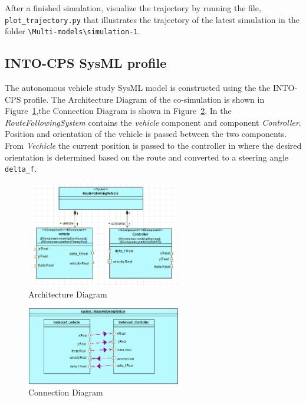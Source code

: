 After a finished simulation, visualize the trajectory by running the file, \texttt{plot\_trajectory.py} that illustrates the trajectory of the latest simulation in the folder \texttt{\textbackslash Multi-models\textbackslash si\-mu\-la\-tion-1}. 

\subsection{INTO-CPS SysML profile}
The autonomous vehicle study SysML model is constructed using the the INTO-CPS profile. The Architecture Diagram of the co-simulation is shown in Figure~\ref{fig:bicycle_architecture_diagram},the Connection Diagram is shown in Figure~\ref{fig:bicycle_connection_diagram}.
In the \textit{RouteFollowingSystem} contains the \textit{vehicle} component and component \textit{Controller}. Position and orientation of the vehicle is passed between the two components. From \textit{Vechicle} the current position is passed to the controller in where the desired orientation is determined based on the route and converted to a steering angle \texttt{delta\_f}. 
	\begin{figure}[htbp]
	\begin{center}
		\includegraphics[width=0.6\textwidth]{vehicle/architecture_structure_diagram.png}
		\caption{Architecture Diagram}
		\label{fig:bicycle_architecture_diagram}
	\end{center}
\end{figure}
\begin{figure}[htbp]
	\begin{center}
		\includegraphics[width=0.6\textwidth]{vehicle/connection_diagram.png}
		\caption{Connection Diagram}
		\label{fig:bicycle_connection_diagram}
	\end{center}
\end{figure}


